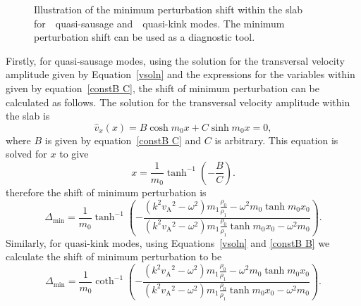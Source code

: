 \documentclass[namedreferences]{solarphysics}
\numberwithin{equation}{section}
\begin{document}
\begin{article}
\begin{figure}
{{{
}\label{fig: min pert shift kink}}}

\caption{Illustration of the minimum perturbation shift within the slab for~\protect{}~quasi-sausage and~\protect{}~quasi-kink modes. The minimum perturbation shift can be used as a diagnostic tool.}
\label{fig: min pert shift}
\end{figure}

Firstly, for quasi-sausage modes, using the solution for the transversal velocity amplitude given by Equation~\eqref{vsoln} and the expressions for the variables within given by equation~\eqref{constB C}, the shift of minimum perturbation can be calculated as follows. The solution for the transversal velocity amplitude within the slab is
\begin{equation}
\widehat{v}_x(x) = B\cosh{m_0x}+C\sinh{m_0x} = 0,
\end{equation}
where $B$ is given by equation~\eqref{constB C} and $C$ is arbitrary. This equation is solved for $x$ to give
\begin{equation}
x = \frac{1}{m_0} \tanh^{-1}\left(-\frac{B}{C}\right). \label{disp of min power saus}
\end{equation}
therefore the shift of minimum perturbation is
\begin{equation}
\Delta_\textrm{min} = \frac{1}{m_0}\tanh^{-1}\left(-\frac{(k^2{v_\textrm{A}}^2-\omega^2)m_1\frac{\rho_0}{\rho_1} - \omega^2{m_0}\tanh{m_0x_0}}{(k^2{v_\textrm{A}}^2-\omega^2)m_1\frac{\rho_0}{\rho_1}\tanh{m_0x_0} - \omega^2{m_0}}\right). \label{shift min saus}
\end{equation}
Similarly, for quasi-kink modes, using Equations~\eqref{vsoln} and \eqref{constB B} we calculate the shift of minimum perturbation to be
\begin{equation}
\Delta_\textrm{min} = \frac{1}{m_0}\coth^{-1}\left(-\frac{(k^2{v_\textrm{A}}^2-\omega^2)m_1\frac{\rho_0}{\rho_1} - \omega^2{m_0}\tanh{m_0x_0}}{(k^2{v_\textrm{A}}^2-\omega^2)m_1\frac{\rho_0}{\rho_1}\tanh{m_0x_0} - \omega^2{m_0}}\right). \label{shift min kink}
\end{equation}


\end{article}
\end{document}
